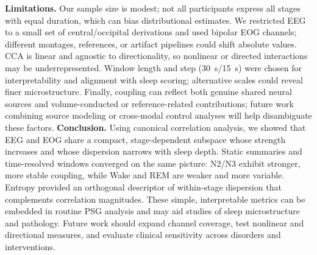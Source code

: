 \textbf{Limitations.}
Our sample size is modest; not all participants express all stages with equal duration, which can bias distributional estimates. We restricted EEG to a small set of central/occipital derivations and used bipolar EOG channels; different montages, references, or artifact pipelines could shift absolute values. CCA is linear and agnostic to directionality, so nonlinear or directed interactions may be underrepresented. Window length and step (30~s/15~s) were chosen for interpretability and alignment with sleep scoring; alternative scales could reveal finer microstructure. Finally, coupling can reflect both genuine shared neural sources and volume-conducted or reference-related contributions; future work combining source modeling or cross-modal control analyses will help disambiguate these factors.
\FloatBarrier
\textbf{Conclusion.}
Using canonical correlation analysis, we showed that EEG and EOG share a compact, stage-dependent subspace whose strength increases and whose dispersion narrows with sleep depth. Static summaries and time-resolved windows converged on the same picture: N2/N3 exhibit stronger, more stable coupling, while Wake and REM are weaker and more variable. Entropy provided an orthogonal descriptor of within-stage dispersion that complements correlation magnitudes. These simple, interpretable metrics can be embedded in routine PSG analysis and may aid studies of sleep microstructure and pathology. Future work should expand channel coverage, test nonlinear and directional measures, and evaluate clinical sensitivity across disorders and interventions.

\renewcommand{\baselinestretch}{1.5}



